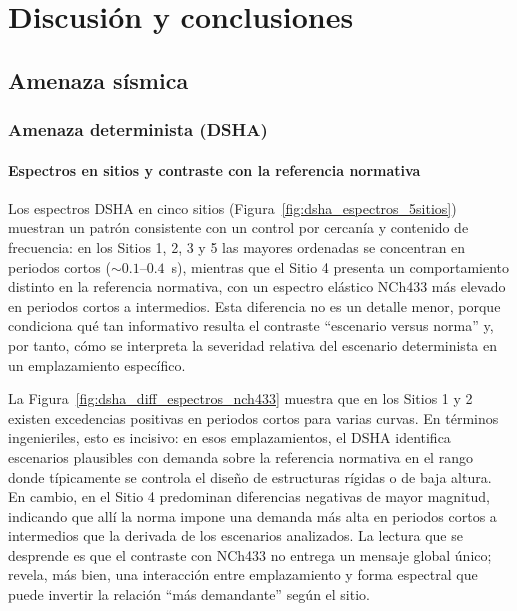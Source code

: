 \chapter{Discusión y conclusiones}
\label{ch:discusion_conclusiones}

\section{Amenaza sísmica}
\label{sec:disc_amenaza}

\subsection{Amenaza determinista (DSHA)}
\label{subsec:disc_dsha}

\subsubsection{Espectros en sitios y contraste con la referencia normativa}
\label{subsubsec:disc_dsha_espectros}

Los espectros DSHA en cinco sitios (Figura~\ref{fig:dsha_espectros_5sitios}) muestran un patrón consistente con un control por cercanía y contenido de frecuencia: en los Sitios 1, 2, 3 y 5 las mayores ordenadas se concentran en periodos cortos ($\sim0.1$--$0.4$~s), mientras que el Sitio 4 presenta un comportamiento distinto en la referencia normativa, con un espectro elástico NCh433 más elevado en periodos cortos a intermedios. Esta diferencia no es un detalle menor, porque condiciona qué tan informativo resulta el contraste ``escenario versus norma'' y, por tanto, cómo se interpreta la severidad relativa del escenario determinista en un emplazamiento específico.

La Figura~\ref{fig:dsha_diff_espectros_nch433} muestra que en los Sitios 1 y 2 existen excedencias positivas en periodos cortos para varias curvas. En términos ingenieriles, esto es incisivo: en esos emplazamientos, el DSHA identifica escenarios plausibles con demanda sobre la referencia normativa en el rango donde típicamente se controla el diseño de estructuras rígidas o de baja altura. En cambio, en el Sitio 4 predominan diferencias negativas de mayor magnitud, indicando que allí la norma impone una demanda más alta en periodos cortos a intermedios que la derivada de los escenarios analizados. La lectura que se desprende es que el contraste con NCh433 no entrega un mensaje global único; revela, más bien, una interacción entre emplazamiento y forma espectral que puede invertir la relación ``más demandante'' según el sitio.

